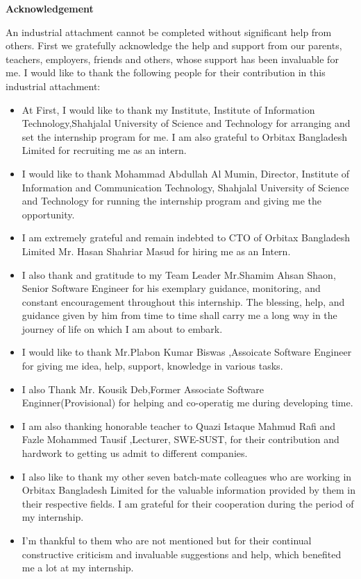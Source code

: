 \vspace{\fill}
\begin{center}
\begin{large}
\textbf{Acknowledgement}\\
\end{large}
\end{center}
\vspace{20pt}
\begin{flushleft}


An industrial attachment cannot be completed without significant help from others. First we gratefully acknowledge the help and support from our parents, teachers, employers, friends and others, whose support has been invaluable for me. I would like to thank the following people for their contribution in this industrial attachment:\\
\renewcommand{\labelitemi}{$\square$}
 \begin{itemize}
   \item At First, I would like to thank my Institute, Institute of Information Technology,Shahjalal University of Science and Technology for arranging and set the internship program for me. I am also grateful to Orbitax Bangladesh Limited for recruiting me as an intern.
    \item I would like to thank Mohammad Abdullah Al Mumin, Director, Institute of Information and Communication Technology, Shahjalal University of Science and Technology for running the internship program and giving me the opportunity.
    \item I am extremely grateful and remain indebted to CTO of Orbitax Bangladesh Limited Mr. Hasan Shahriar Masud for hiring me as an Intern.
    \item I also thank and gratitude to my Team Leader Mr.Shamim Ahsan Shaon, Senior Software Engineer for his exemplary guidance, monitoring, and constant encouragement throughout this internship. The blessing, help, and guidance given by him from time to time shall carry me a long way in the journey of life on which I am about to embark.
    \item I would like to thank Mr.Plabon Kumar Biswas ,Assoicate Software Engineer for giving me idea, help, support, knowledge in various tasks.
    \item I also Thank Mr. Kousik Deb,Former Associate Software Enginner(Provisional) for helping and co-operatig me during developing time.
    \item I am also thanking honorable teacher to Quazi Istaque Mahmud Rafi and Fazle Mohammed Tausif ,Lecturer, SWE-SUST, for their contribution and hardwork to getting us admit to different companies.
    \item I also like to thank my other seven batch-mate colleagues who are working in Orbitax Bangladesh Limited  for the valuable information provided by them in their respective fields. I am grateful for their cooperation during the period of my internship.
    \item I'm thankful to them who are not mentioned but for their continual constructive criticism and invaluable suggestions and help, which benefited me a lot at my internship.



\end{itemize}
\end{flushleft}
